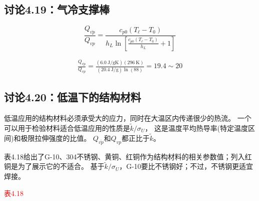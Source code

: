 \subsection{讨论4.19：气冷支撑棒}
\begin{equation}%
\frac{Q_{\bar{vp}}}{Q_{vp}}=\frac{c_{p0}(T_\ell-T_0)}{h_L\ln\left[\frac{c_{p0}(T_\ell-T_0)}{h_L}+1\right]}
\end{equation}

\begin{align*}
\frac{Q_{\bar{vp}}}{Q_{vp}}=\frac{(6.0\ \mathrm{J/gK})(296\ \mathrm{K})}{(20.4\ \mathrm{J/g})\ln(88)}=19.4\sim 20
\end{align*}



\subsection{讨论4.20：低温下的结构材料}
低温应用的结构材料必须承受大的应力，同时在大温区内传递很少的热流。
一个可以用于检验材料适合低温应用的性质是$\tilde{k}/\sigma_U$，
这是温度平均热导率(特定温度区间)和极限拉伸强度的比值。
$Q_{\bar{vp}}$和$Q_{vp}$都正比于$\tilde{k}$。

表4.18给出了G-10、304不锈钢、黄铜、红铜作为结构材料的相关参数值；列入红铜是为了展示它的不适合。
基于$\tilde{k}/\sigma_U$，G-10要比不锈钢好；不过，不锈钢更适宜焊接。

\textcolor{red}{表4.18}